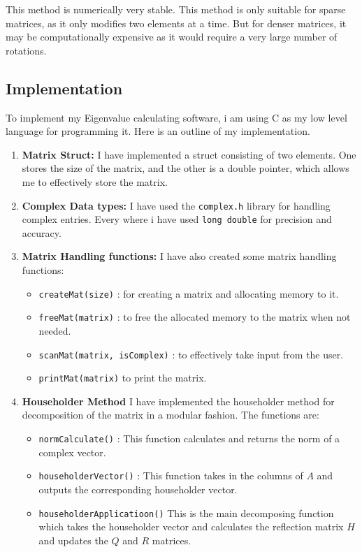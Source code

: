 \documentclass{article}
\begin{document}
This method is numerically very stable. This method is only suitable for sparse matrices, as it only modifies two elements at a time. But for denser matrices, it may be computationally expensive as it would require a very large number of rotations.

\subsection{Implementation}
To implement my Eigenvalue calculating software, i am using C as my low level language for programming it. Here is an outline of my implementation.
\begin{enumerate}
    \item \textbf{Matrix Struct: } I have implemented a struct consisting of two elements. One stores the size of the matrix, and the other is a double pointer, which allows me to effectively store the matrix.
    \item \textbf{Complex Data types:} I have used the \texttt{complex.h} library for handling complex entries. Every where i have used \texttt{long double} for precision and accuracy.
    \item \textbf{Matrix Handling functions:} I have also created some matrix handling functions:
    \begin{itemize}
        \item \texttt{createMat(size)} : for creating a matrix and allocating memory to it.
        \item \texttt{freeMat(matrix)} : to free the allocated memory to the matrix when not needed.
        \item \texttt{scanMat(matrix, isComplex)} : to effectively take input from the user.
        \item \texttt{printMat(matrix)} to print the matrix.
    \end{itemize}
    \item \textbf{Householder Method} I have implemented the householder method for decomposition of the matrix in a modular fashion. The functions are:
    \begin{itemize}
        \item \texttt{normCalculate()} : This function calculates and returns the norm of a complex vector.
        \item \texttt{householderVector()} : This function takes in the columns of $A$ and outputs the corresponding householder vector.
        \item \texttt{householderApplicatioon()} This is the main decomposing function which takes the householder vector and calculates the reflection matrix $H$ and updates the $Q$ and $R$ matrices.

\end{itemize}
\end{enumerate}
\end{document}
